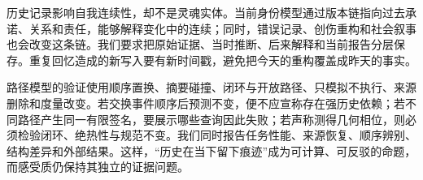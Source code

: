 历史记录影响自我连续性，却不是灵魂实体。当前身份模型通过版本链指向过去承诺、关系和责任，能够解释变化中的连续；同时，错误记录、创伤重构和社会叙事也会改变这条链。我们要求把原始证据、当时推断、后来解释和当前报告分层保存。重复回忆造成的新写入要有新时间戳，避免把今天的重构覆盖成昨天的事实。

路径模型的验证使用顺序置换、摘要碰撞、闭环与开放路径、只模拟不执行、来源删除和度量改变。若交换事件顺序后预测不变，便不应宣称存在强历史依赖；若不同路径产生同一有限签名，要展示哪些查询因此失败；若声称测得几何相位，则必须检验闭环、绝热性与规范不变。我们同时报告任务性能、来源恢复、顺序辨别、结构差异和外部结果。这样，“历史在当下留下痕迹”成为可计算、可反驳的命题，而感受质仍保持其独立的证据问题。
